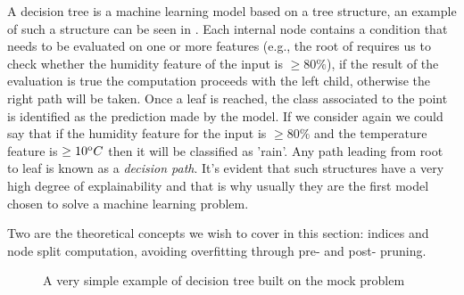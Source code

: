 \smallskip

A decision tree is a machine learning model based on a tree structure, an example of such a
structure can be seen in . Each internal node contains a condition that needs to
be evaluated on one or more features (e.g.,  the root of  requires us to check
whether the humidity feature of the input is $\geq 80\%$), if the result of the evaluation is true
the computation proceeds with the left child, otherwise the right path will be taken. Once a leaf is
reached, the class associated to the point is identified as the prediction made by the model. If we consider again  we could say that if the humidity feature for the input is $\geq 80\%$ and the temperature feature is $\geq 10^\text{o}C$ then it will be classified as 'rain'. Any path leading from root to leaf is known as a \emph{decision path}. It's evident that such structures have a very high degree of explainability and that is why usually they are the first model chosen to solve a machine learning problem.

\medskip

Two are the theoretical concepts we wish to cover in this section: indices and node split
computation, avoiding overfitting through pre- and post- pruning.
\begin{figure}
	\centering
	\caption{A very simple example of decision tree built on the mock problem}
	\label{fig:simple-dt}
\end{figure}
